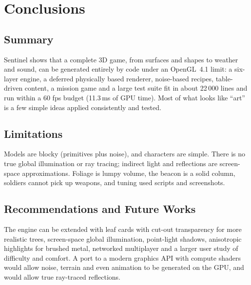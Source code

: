 \documentclass[12pt,a4paper,oneside]{report}
\begin{document}
\chapter{Conclusions}

\section{Summary}
Sentinel shows that a complete 3D game, from surfaces and shapes to weather and sound, can be generated entirely by code under an OpenGL~4.1 limit: a six-layer engine, a deferred physically based renderer, noise-based recipes, table-driven content, a mission game and a large test suite fit in about 22\,000 lines and run within a 60 fps budget (11.3\,ms of GPU time). Most of what looks like ``art'' is a few simple ideas applied consistently and tested.

\section{Limitations}
Models are blocky (primitives plus noise), and characters are simple. There is no true global illumination or ray tracing; indirect light and reflections are screen-space approximations. Foliage is lumpy volume, the beacon is a solid column, soldiers cannot pick up weapons, and tuning used scripts and screenshots.

\section{Recommendations and Future Works}
The engine can be extended with leaf cards with cut-out transparency for more realistic trees, screen-space global illumination, point-light shadows, anisotropic highlights for brushed metal, networked multiplayer and a larger user study of difficulty and comfort. A port to a modern graphics API with compute shaders would allow noise, terrain and even animation to be generated on the GPU, and would allow true ray-traced reflections.
\end{document}

